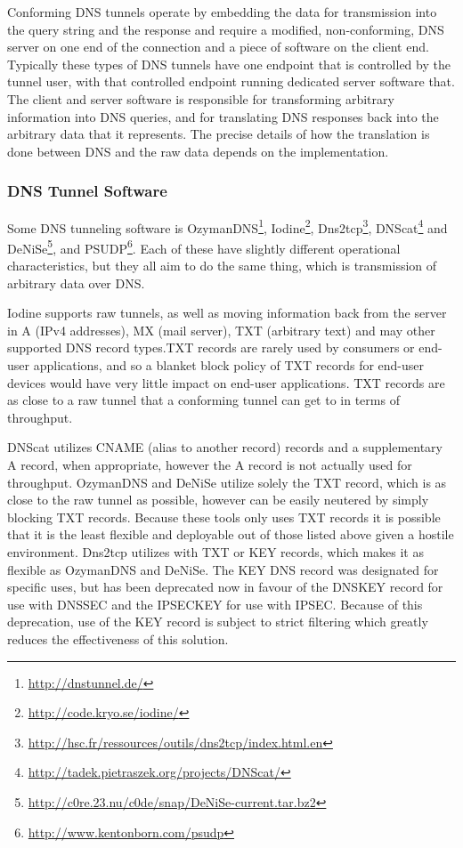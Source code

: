 \documentclass[12pt]{article}
\theoremstyle{remark}
\theoremstyle{definition}
\theoremstyle{definition}
\theoremstyle{definition}
\begin{document}
Conforming DNS tunnels operate by embedding the data for transmission into the
query string and the response and require a modified, non-conforming, DNS
server on one end of the connection and a piece of software on the client end.
Typically these types of DNS tunnels have one endpoint that is controlled by the
tunnel user, with that controlled endpoint running dedicated server software
that. The client and server software is responsible for transforming arbitrary
information into DNS queries, and for translating DNS responses back into the
arbitrary data that it represents. The precise details of how the translation
is done between DNS and the raw data depends on the implementation.

\subsubsection{DNS Tunnel Software}

Some DNS tunneling software is OzymanDNS\footnote{\url{http://dnstunnel.de/}},
Iodine\footnote{\url{http://code.kryo.se/iodine/}},
Dns2tcp\footnote{\url{http://hsc.fr/ressources/outils/dns2tcp/index.html.en}},
DNScat\footnote{\url{http://tadek.pietraszek.org/projects/DNScat/}} and
DeNiSe\footnote{\url{http://c0re.23.nu/c0de/snap/DeNiSe-current.tar.bz2}}, and
PSUDP\footnote{\url{http://www.kentonborn.com/psudp}}. Each of these have
slightly different operational characteristics, but they all aim to do the same
thing, which is transmission of arbitrary data over DNS.

Iodine supports raw tunnels, as well as moving information back from the server
in A (IPv4 addresses), MX (mail server), TXT (arbitrary text) and may other
supported DNS record types.TXT records are rarely used by
consumers or end-user applications, and so a blanket block policy of TXT
records for end-user devices would have very little impact on end-user
applications. TXT records are as close to a raw tunnel that a conforming
tunnel can get to in terms of throughput.

DNScat utilizes CNAME (alias to
another record) records and a supplementary A record, when appropriate, however
the A record is not actually used for throughput. OzymanDNS and DeNiSe utilize
solely the
TXT record, which is as close to the raw tunnel as possible, however can be
easily neutered by simply blocking TXT records. Because these tools only uses
TXT records it is possible that it is the least flexible and deployable out of
those listed above given a hostile environment. Dns2tcp utilizes with TXT or
KEY records, which makes it as flexible as OzymanDNS and DeNiSe. The KEY DNS
record was designated for specific uses\cite{rfc2931}, but has been
deprecated now\cite{rfc3445} in favour of the DNSKEY record for use with
DNSSEC\cite{rfc3755} and the IPSECKEY for use with
IPSEC\cite{rfc4025}. Because of this deprecation, use of the KEY record is
subject to strict filtering which greatly reduces the effectiveness of this
solution.
\end{document}
